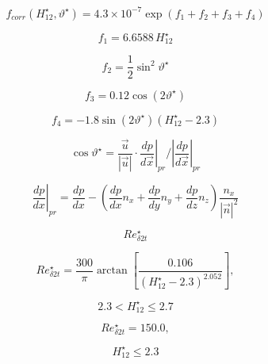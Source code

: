 \begin{equation}
f_{corr} (H_{12}^{\star}, \vartheta^{\star}) = 4.3 \times 10^{-7} \exp(f_1 + f_2 + f_3 + f_4)
\end{equation}

\begin{equation}
f_1 = 6.6588 \, H_{12}^{\star}
\end{equation}

\begin{equation}
f_2 = \frac{1}{2} \sin^2 \vartheta^{\star}
\end{equation}

\begin{equation}
f_3 = 0.12 \cos\left(2 \vartheta^{\star}\right)
\end{equation}

\begin{equation}
f_4 = -1.8 \sin\left(2 \vartheta^{\star}\right) \left(H_{12}^{\star} - 2.3\right)
\end{equation}

\begin{equation}
\cos \vartheta^{\star} = \frac{\vec{u}}{\left|\vec{u}\right|} \cdot
\left.\frac{dp}{d\vec{x}}\right|_{pr} /
\left|\frac{dp}{d\vec{x}}\right|_{pr}
\end{equation}

\begin{equation}
\left.\frac{dp}{dx}\right|_{pr} =
\frac{dp}{dx} - 
\left(\frac{dp}{dx} n_{x} +
\frac{dp}{dy} n_{y} +
\frac{dp}{dz} n_{z}\right) 
\frac{n_{x}}{\left|\vec{n}\right|^2}
\end{equation}

\begin{equation}
Re_{\delta 2t}^{\star}
\end{equation}

\begin{equation}
Re^{\star}_{\delta 2t} = \frac{300}{\pi} \arctan \left[
\frac{0.106}{\left(H_{12}^{\star}-2.3\right)^{2.052}} \right],
\end{equation}

\begin{equation}
2.3 < H^{\star}_{12} \le 2.7
\end{equation}

\begin{equation}
Re^{\star}_{\delta 2t} = 150.0,
\end{equation}

\begin{equation}
H^{\star}_{12} \leq 2.3
\end{equation}

